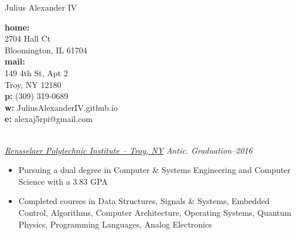 \documentclass[11pt]{article} %
\begin{document}
\title{}
\centerline{ {\Huge \sc Julius Alexander IV} }

\begin{multicols}{3}
\noindent \textbf{home:} \\
2704 Hall Ct \\
Bloomington, IL 61704 \\

\noindent \textbf{mail:} \\
149 4th St, Apt 2 \\
Troy, NY 12180 \\

\noindent \textbf{p:} (309) 319-0689 \\
\noindent \textbf{w:} JuliusAlexanderIV.github.io \\
\noindent \textbf{e:} alexaj5rpi@gmail.com
\end{multicols}


 \hrulefill\\
\noindent
\underline{\textit{Rensselaer Polytechnic Institute -- Troy, NY}} \hfill \textit{Antic. Graduation--2016}

\begin{itemize}[noitemsep]
\renewcommand\labelitemi{$\circ$}

\item Pursuing a dual degree in Computer \& Systems Engineering and Computer Science with a 3.83 GPA
\item Completed courses in Data Structures, Signals \& Systems, Embedded Control, Algorithms, Computer Architecture, Operating Systems, Quantum Physics, Programming Languages, Analog Electronics
\end{itemize}

\end{document}
